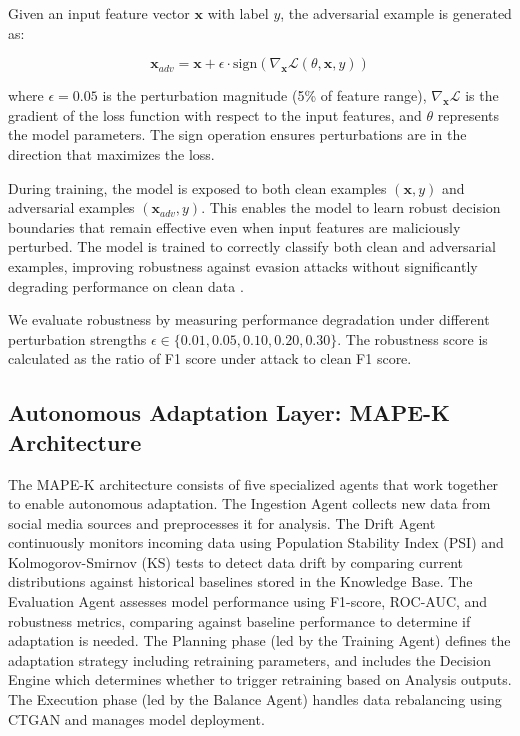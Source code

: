\documentclass{svproc}
\begin{document}
Given an input feature vector $\mathbf{x}$ with label $y$, the adversarial example is generated as:

\begin{equation}
\mathbf{x}_{adv} = \mathbf{x} + \epsilon \cdot \text{sign}(\nabla_{\mathbf{x}} \mathcal{L}(\theta, \mathbf{x}, y))
\end{equation}

where $\epsilon = 0.05$ is the perturbation magnitude (5\% of feature range), $\nabla_{\mathbf{x}} \mathcal{L}$ is the gradient of the loss function with respect to the input features, and $\theta$ represents the model parameters. The sign operation ensures perturbations are in the direction that maximizes the loss.

During training, the model is exposed to both clean examples $(\mathbf{x}, y)$ and adversarial examples $(\mathbf{x}_{adv}, y)$. This enables the model to learn robust decision boundaries that remain effective even when input features are maliciously perturbed. The model is trained to correctly classify both clean and adversarial examples, improving robustness against evasion attacks without significantly degrading performance on clean data \cite{goodfellow2014gan}.

We evaluate robustness by measuring performance degradation under different perturbation strengths $\epsilon \in \{0.01, 0.05, 0.10, 0.20, 0.30\}$. The robustness score is calculated as the ratio of F1 score under attack to clean F1 score.

\subsection{Autonomous Adaptation Layer: MAPE-K Architecture}

The MAPE-K architecture consists of five specialized agents that work together to enable autonomous adaptation. The Ingestion Agent collects new data from social media sources and preprocesses it for analysis. The Drift Agent continuously monitors incoming data using Population Stability Index (PSI) and Kolmogorov-Smirnov (KS) tests to detect data drift by comparing current distributions against historical baselines stored in the Knowledge Base. The Evaluation Agent assesses model performance using F1-score, ROC-AUC, and robustness metrics, comparing against baseline performance to determine if adaptation is needed. The Planning phase (led by the Training Agent) defines the adaptation strategy including retraining parameters, and includes the Decision Engine which determines whether to trigger retraining based on Analysis outputs. The Execution phase (led by the Balance Agent) handles data rebalancing using CTGAN and manages model deployment.
\end{document}
